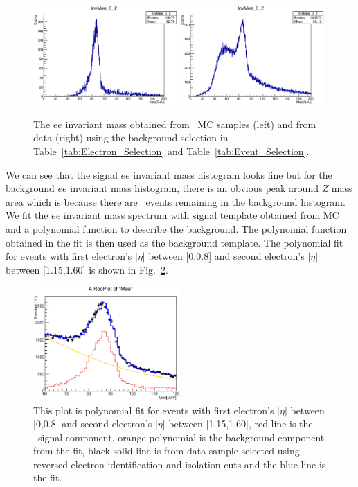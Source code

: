 \begin{figure}[htbp] 
  \centering
  \includegraphics[width=0.49\textwidth]{figures/ChargeMisID/MergeEt_Ntot_ZeeBkg02.eps}
  \includegraphics[width=0.49\textwidth]{figures/ChargeMisID/MergeEt_Ntot_Bkg02.eps}
  \caption{The $ee$ invariant mass obtained from \Zee\ MC samples
    (left) and from data (right) using the background selection in
    Table~\ref{tab:Electron_Selection} and
    Table~\ref{tab:Event_Selection}.}
  \label{fig:Mee}
\end{figure}

 We can see that the signal $ee$ invariant mass histogram looks fine
 but for the background $ee$ invariant mass histogram, there is an
 obvious peak around $Z$ mass area which is because there are
 \Zee\ events remaining in the background histogram. We fit the $ee$
 invariant mass spectrum with signal template obtained from MC and a
 polynomial function to describe the background. The polynomial
 function obtained in the fit is then used as the background
 template. The polynomial fit for events with first electron's
 $|\eta|$ between [0,0.8] and second electron's $|\eta|$ between
 [1.15,1.60] is shown in Fig.~\ref{fig:Polynomialac}.
\begin{figure}[htp]
\centering
\includegraphics[width=0.5\textwidth]{figures/ChargeMisID/Tot_Polynomial_0_2.eps}
\caption{This plot is polynomial fit for events with first electron's
  $|\eta|$ between [0,0.8] and second electron's $|\eta|$ between
  [1.15,1.60], red line is the \Zee\ signal component, orange
  polynomial is the background component from the fit, black solid
  line is from data sample selected using reversed electron
  identification and isolation cuts and the blue line is the fit.}
\label{fig:Polynomialac}
\end{figure} 

